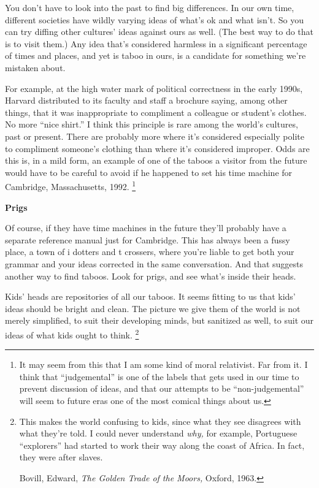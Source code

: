 You don't have to look into the past to find big differences. In our own
time, different societies have wildly varying ideas of what's ok and
what isn't. So you can try diffing other cultures' ideas against ours as
well. (The best way to do that is to visit them.) Any idea that's
considered harmless in a significant percentage of times and places, and
yet is taboo in ours, is a candidate for something we're mistaken about.

For example, at the high water mark of political correctness in the
early 1990s, Harvard distributed to its faculty and staff a brochure
saying, among other things, that it was inappropriate to compliment a
colleague or student's clothes. No more ``nice shirt.'' I think this
principle is rare among the world's cultures, past or present. There are
probably more where it's considered especially polite to compliment
someone's clothing than where it's considered improper. Odds are this
is, in a mild form, an example of one of the taboos a visitor from the
future would have to be careful to avoid if he happened to set his time
machine for Cambridge, Massachusetts, 1992. \footnote{It may seem from this that I am some kind of moral relativist.
Far from it. I think that ``judgemental'' is one of the labels that gets
used in our time to prevent discussion of ideas, and that our attempts
to be ``non-judgemental'' will seem to future eras one of the most
comical things about us.}

\textbf{Prigs}

Of course, if they have time machines in the future they'll probably
have a separate reference manual just for Cambridge. This has always
been a fussy place, a town of i dotters and t crossers, where you're
liable to get both your grammar and your ideas corrected in the same
conversation. And that suggests another way to find taboos. Look for
prigs, and see what's inside their heads.

Kids' heads are repositories of all our taboos. It seems fitting to us
that kids' ideas should be bright and clean. The picture we give them of
the world is not merely simplified, to suit their developing minds, but
sanitized as well, to suit our ideas of what kids ought to think.
\footnote{This makes the world confusing to kids, since what they see
disagrees with what they're told. I could never understand \emph{why,}
for example, Portuguese ``explorers'' had started to work their way
along the coast of Africa. In fact, they were after slaves.

Bovill, Edward, \emph{The Golden Trade of the Moors,} Oxford, 1963.}

